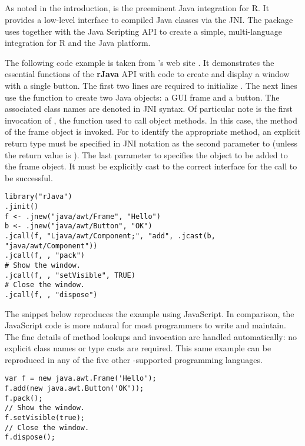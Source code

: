 \subsection{}

As noted in the introduction,  is the preeminent Java integration for R. It provides a low-level interface to compiled Java classes via the JNI. The  package uses  together with the Java Scripting API to create a simple, multi-language integration for R and the Java platform.

The following code example is taken from 's web site \citep{rjavaweb}. It demonstrates the essential functions of the \textbf{rJava} API with code to create and display a window with a single button. The first two lines are required to initialize . The next lines use the  function to create two Java objects: a GUI frame and a button. The associated class names are denoted in JNI syntax. Of particular note is the first invocation of , the function used to call object methods. In this case, the  method of the frame object is invoked. For  to identify the appropriate method, an explicit return type must be specified in JNI notation as the second parameter to  (unless the return value is ). The last parameter to  specifies the object to be added to the frame object. It must be explicitly cast to the correct interface for the call to be successful.

\begin{verbatim}
library("rJava")
.jinit()
f <- .jnew("java/awt/Frame", "Hello")
b <- .jnew("java/awt/Button", "OK")
.jcall(f, "Ljava/awt/Component;", "add", .jcast(b, "java/awt/Component"))
.jcall(f, , "pack")
# Show the window.
.jcall(f, , "setVisible", TRUE)
# Close the window.
.jcall(f, , "dispose")
\end{verbatim}

The snippet below reproduces the  example using JavaScript. In comparison, the JavaScript code is more natural for most programmers to write and maintain. The fine details of method lookups and invocation are handled automatically: no explicit class names or type casts are required. This same example can be reproduced in any of the five other -supported programming languages.

\begin{verbatim}
var f = new java.awt.Frame('Hello');
f.add(new java.awt.Button('OK'));
f.pack();
// Show the window.
f.setVisible(true);
// Close the window.
f.dispose();
\end{verbatim}

